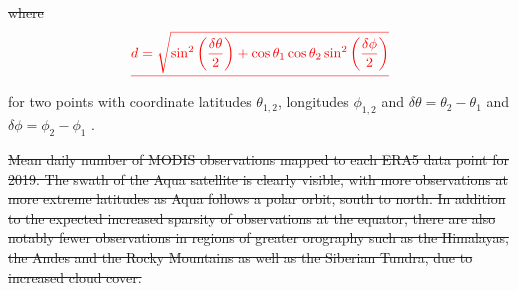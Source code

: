\documentclass[hess, twostagejnl]{copernicus}
\providecommand{\DIFdel}[1]{{\protect\color{red}\sout{#1}}}                      %
\providecommand{\DIFdelbegin}{} %
\providecommand{\DIFdelend}{} %
\providecommand{\DIFdelFL}[1]{\DIFdel{#1}} %
\begin{document}
\DIFdelbegin \DIFdel{where
}\begin{eqnarray*}
	\DIFdel{d = \sqrt{\sin^2\left(\frac{\delta\theta}{2}\right) + \cos \theta_1 \cos \theta_2 \sin^2\left(\frac{\delta \phi}{2}\right) }
}\end{eqnarray*}%
\DIFdelend for two points with coordinate latitudes $\theta_{1,2}$, longitudes $\phi_{1,2}$ and $\delta \theta = \theta_2 - \theta_1$ and  $\delta \phi = \phi_2 - \phi_1$ . 

\DIFdelbegin %
{%
\DIFdelFL{Mean daily number of MODIS observations mapped to each ERA5 data point for 2019. The swath of the Aqua satellite is clearly visible, with more observations at more extreme latitudes as Aqua follows a polar orbit, south to north. In addition to the expected increased sparsity of observations at the equator, there are also notably fewer observations in regions of greater orography such as the Himalayas, the Andes and the  Rocky Mountains as well as the Siberian Tundra, due to increased cloud cover.}} 
\DIFdelend 
\end{document}
